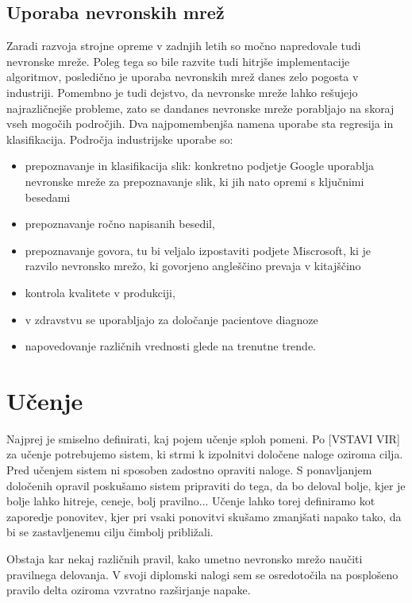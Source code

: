 \documentclass[mat1]{fmfdelo}
\begin{document}
\subsection{Uporaba nevronskih mrež}
Zaradi razvoja strojne opreme v zadnjih letih so močno napredovale tudi nevronske mreže. Poleg tega so bile razvite tudi hitrjše implementacije algoritmov, posledično je uporaba nevronskih mrež danes zelo pogosta v industriji. Pomembno je tudi dejstvo, da nevronske mreže lahko rešujejo najrazličnejše probleme, zato se dandanes nevronske mreže porabljajo na skoraj vseh mogočih področjih. Dva najpomembenjša namena uporabe sta regresija in klasifikacija. Področja industrijske uporabe so: 
\begin{itemize}
\item prepoznavanje in klasifikacija slik: konkretno podjetje Google uporablja nevronske mreže za prepoznavanje slik, ki jih nato opremi s ključnimi besedami
\item prepoznavanje ročno napisanih besedil,
\item prepoznavanje  govora, tu bi veljalo izpostaviti podjete Miscrosoft, ki je razvilo nevronsko mrežo, ki govorjeno angleščino prevaja v kitajščino
\item kontrola kvalitete v produkciji,
\item v zdravstvu se uporabljajo za določanje pacientove diagnoze
\item napovedovanje različnih vrednosti glede na trenutne trende.

\end{itemize}


\section{Učenje}
Najprej je smiselno definirati, kaj pojem učenje sploh pomeni. Po [VSTAVI VIR] za učenje potrebujemo sistem, ki strmi k izpolnitvi določene naloge oziroma cilja. Pred učenjem sistem ni sposoben zadostno opraviti naloge. S ponavljanjem določenih opravil poskušamo sistem pripraviti do tega, da bo deloval bolje, kjer je bolje lahko hitreje, ceneje, bolj pravilno... Učenje lahko torej definiramo kot zaporedje ponovitev, kjer pri vsaki ponovitvi skušamo zmanjšati napako tako, da bi se zastavljenemu cilju čimbolj približali. 

Obstaja kar nekaj različnih pravil, kako umetno nevronsko mrežo naučiti pravilnega delovanja. V svoji diplomski nalogi sem se osredotočila na posplošeno pravilo delta oziroma vzvratno razširjanje napake. 
\end{document}
